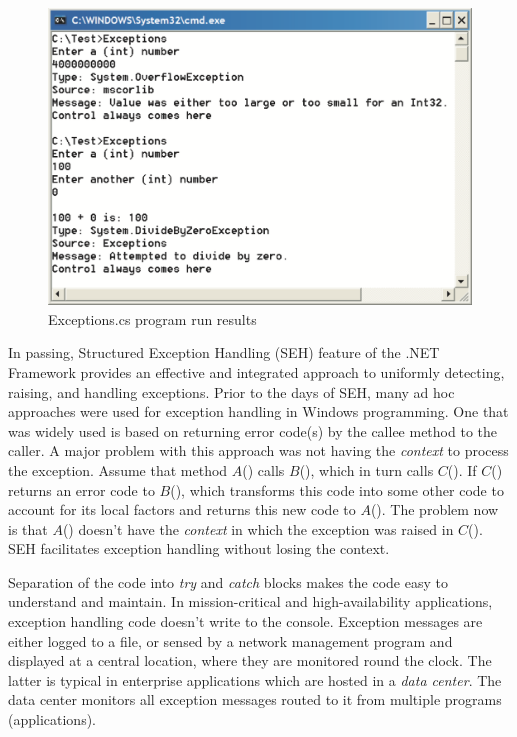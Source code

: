 \begin{figure}
\centering
\includegraphics[scale=0.55]{./CSharpBasics/Illus/ExceptionsOut}
\caption{Exceptions.cs program run results}
\label{fig:ExceptionsOut}
\end{figure}

In passing, Structured Exception Handling (SEH) feature of the
.NET Framework provides an effective and integrated approach to
uniformly detecting, raising, and handling exceptions. Prior to
the days of SEH, many ad hoc approaches were used for exception
handling in Windows programming. One that was widely used is based
on returning error code(s) by the callee method to the caller. A
major problem with this approach was not having the \emph{context}
to process the exception. Assume that method $A$() calls $B$(),
which in turn calls $C$(). If $C$() returns an error code to
$B$(), which transforms this code into some other code to account
for its local factors and returns this new code to $A$(). The
problem now is that $A$() doesn't have the \emph{context} in which
the exception was raised in $C$(). SEH facilitates exception
handling without losing the context.

Separation of the code into \emph{try} and \emph{catch} blocks
makes the code easy to understand and maintain. In
mission-critical and high-availability applications, exception
handling code doesn't write to the console. Exception messages are
either logged to a file, or sensed by a network management program
and displayed at a central location, where they are monitored
round the clock. The latter is typical in enterprise applications
which are hosted in a \emph{data center}. The data center monitors
all exception messages routed to it from multiple programs
(applications).

